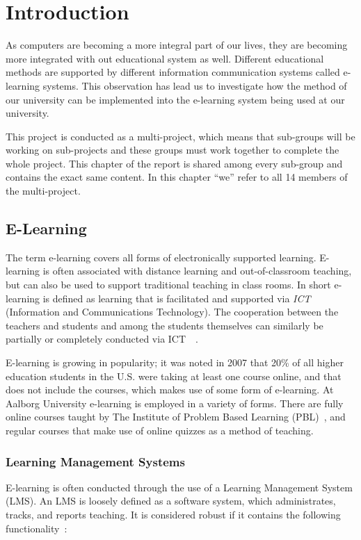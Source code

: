 \chapter{Introduction}
As computers are becoming a more integral part of our lives, they are becoming more integrated with out educational system as well.
Different educational methods are supported by different information communication systems called e-learning systems.
This observation has lead us to investigate how the method of our university can be implemented into the e-learning system being used at our university.

This project is conducted as a multi-project, which means that sub-groups will be working on sub-projects and these groups must work together to complete the whole project.
This chapter of the report is shared among every sub-group and contains the exact same content.
In this chapter ``we'' refer to all 14 members of the multi-project.

\section{E-Learning}
\label{sec:e-learning}
The term e-learning covers all forms of electronically supported learning. 
E-learning is often associated with distance learning and out-of-classroom teaching, but can also be used to support traditional teaching in class rooms. 
In short e-learning is defined as learning that is facilitated and supported via \emph{ICT} (Information and Communications Technology). 
The cooperation between the teachers and students and among the students themselves can similarly be partially or completely conducted via ICT~\cite{def-e-learning1}~\cite{def-e-learning2}.

E-learning is growing in popularity; it was noted in 2007 that 20\% of all higher education students in the U.S. were taking at least one course online, and that does not include the courses, which makes use of some form of e-learning.	
At Aalborg University e-learning is employed in a variety of forms. 
There are fully online courses taught by The Institute of Problem Based Learning (PBL)~\cite{mpbl}, and regular courses that make use of online quizzes as a method of teaching.

\subsection{Learning Management Systems}
\label{sub:lms}
E-learning is often conducted through the use of a Learning Management System (LMS). 
An LMS is loosely defined as a software system, which administrates, tracks, and reports teaching. 
It is considered robust if it contains the following functionality~\citep{Ellis09}:

